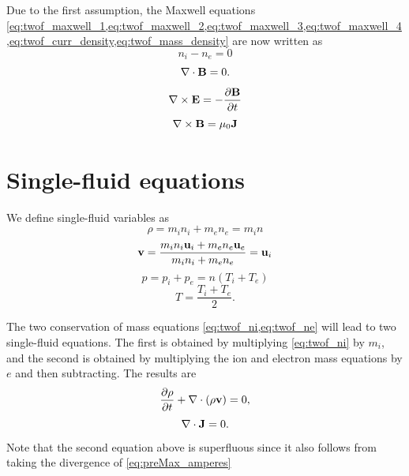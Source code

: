 \documentclass[oneside,a4paper,11pt]{report}
\begin{document}
Due to the first assumption, the Maxwell equations \cref{eq:twof_maxwell_1,eq:twof_maxwell_2,eq:twof_maxwell_3,eq:twof_maxwell_4,eq:twof_curr_density,eq:twof_mass_density} are now written as
\begin{equation}
\label{eq:preMax_gauss}
n_i - n_e = 0
\end{equation}
\begin{equation}
\label{eq:preMax_Bdiv}
\nabla \cdot \mathbf{B} = 0.
\end{equation}
\begin{equation}
\label{eq:preMax_faradays}
\nabla \times \mathbf{E} = -\frac{ \partial \mathbf{B}}{\partial t}
\end{equation}
\begin{equation}
\label{eq:preMax_amperes}
\nabla \times \mathbf{B} = \mu_0 \mathbf{J} 
\end{equation}

\section{Single-fluid equations}
We define single-fluid variables as
\begin{equation}
    \rho = m_i n_i + m_e n_e = m_i n
\end{equation}
\begin{equation}
    \mathbf{v} = \frac{m_i n_i \mathbf{u}_i + m_e n_e \mathbf{u}_e}{m_i n_i + m_e n_e} = \mathbf{u}_i
\end{equation}
\begin{equation}
    p = p_i + p_e = n (T_i + T_e)
\end{equation}
\begin{equation}
    T = \frac{T_i + T_e}{2}.
\end{equation}

The two conservation of mass equations \cref{eq:twof_ni,eq:twof_ne} will lead to two single-fluid equations. The first is obtained by multiplying \cref{eq:twof_ni} by $m_i$, and the second is obtained by multiplying the ion and electron mass equations by $e$ and then subtracting. The results are
\begin{equation}
    \frac{\partial \rho}{\partial t} + \nabla \cdot (\rho \mathbf{v}) = 0,
\end{equation}
\begin{equation}
    \nabla \cdot \mathbf{J} = 0.
\end{equation}
Note that the second equation above is superfluous since it also follows from taking the divergence of \cref{eq:preMax_amperes}
\end{document}

